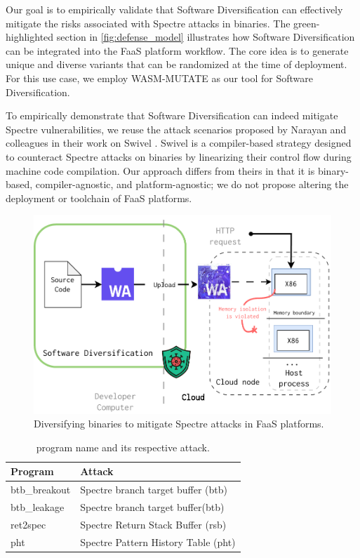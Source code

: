 


Our goal is to empirically validate that Software Diversification can effectively mitigate the risks associated with Spectre attacks in \Wasm binaries. 
The green-highlighted section in \autoref{fig:defense_model} illustrates how Software Diversification can be integrated into the FaaS platform workflow. 
The core idea is to generate unique and diverse \Wasm variants that can be randomized at the time of deployment. 
For this use case, we employ WASM-MUTATE as our tool for Software Diversification.

To empirically demonstrate that Software Diversification can indeed mitigate Spectre vulnerabilities, we reuse the \Wasm attack scenarios proposed by Narayan and colleagues in their work on Swivel \cite{Swivel}. 
Swivel is a compiler-based strategy designed to counteract Spectre attacks on \Wasm binaries by linearizing their control flow during machine code compilation. 
Our approach differs from theirs in that it is binary-based, compiler-agnostic, and platform-agnostic; we do not propose altering the deployment or toolchain of FaaS platforms. 


\begin{figure}[h]
    \centering
    \includegraphics[width=0.75\linewidth]{figures/edge_protected.pdf}
    \caption{Diversifying \Wasm binaries to mitigate Spectre attacks in FaaS platforms.}
    \label{fig:defense_model}
\end{figure}

\begin{table}
    \centering
    \begin{tabular}{l | l  }
        \hline
         Program &  Attack  \\
        \hline \hline
        btb\_breakout & Spectre branch target buffer (btb)  \\
        \hline
         btb\_leakage & Spectre branch target buffer(btb)  \\
        \hline
         ret2spec &  Spectre Return Stack Buffer (rsb)  \\
        \hline
        pht &  Spectre Pattern History Table (pht)  \\

    \end{tabular}
    \caption{\Wasm program name and its respective attack.}
    \label{programs}
\end{table}

